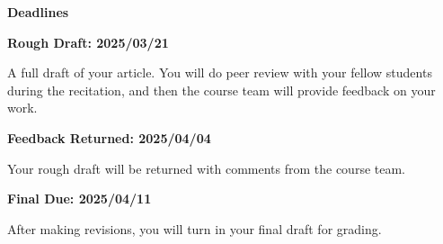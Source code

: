 \documentclass{article}
\begin{document}
    \par\hfill\par
    \textbf{\Large{Deadlines}}
    \par\hfill\par
    \textbf{Rough Draft: 2025/03/21}
    \par
    A full draft of your article. You will do peer review with your fellow
    students during the recitation, and then the course team will provide
    feedback on your work.
    \par\hfill\par
    \textbf{Feedback Returned: 2025/04/04}
    \par
    Your rough draft will be returned with comments from the course team.
    \par\hfill\par
    \textbf{Final Due: 2025/04/11}
    \par
    After making revisions, you will turn in your final draft for grading.
\end{document}
